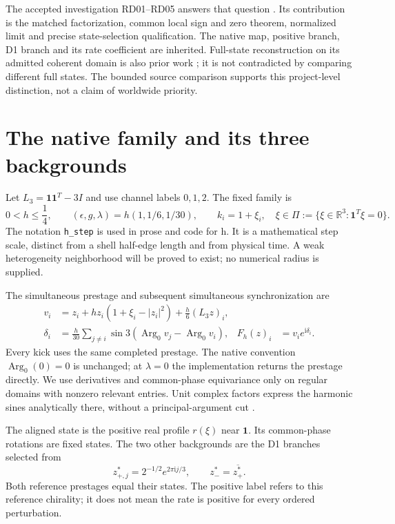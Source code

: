 \documentclass[11pt,a4paper]{article}
\numberwithin{equation}{section}
\theoremstyle{remark}\newtheorem{remark}[theorem]{Remark}
\newcommand{\R}{\mathbb R}\newcommand{\C}{\mathbb C}\newcommand{\one}{\mathbf1}
\newcommand{\iu}{\mathrm i}\newcommand{\Id}{I}\newcommand{\Argz}{\operatorname{Arg}_0}
\begin{document}
The accepted investigation RD01--RD05 answers that question \cite{rd,review}. Its contribution is the matched factorization, common local sign and zero theorem, normalized limit and precise state-selection qualification. The native map, positive branch, D1 branch and its rate coefficient are inherited. Full-state reconstruction on its admitted coherent domain is also prior work \cite{phase}; it is not contradicted by comparing different full states. The bounded source comparison supports this project-level distinction, not a claim of worldwide priority.

\clearpage
\section{The native family and its three backgrounds}\label{sec:setting}
Let $L_3=\one\one^T-3I$ and use channel labels $0,1,2$. The fixed family is
\begin{equation}
0<h\le\frac14,\qquad (\epsilon,g,\lambda)=h(1,1/6,1/30),\qquad
k_i=1+\xi_i,\quad \xi\in\Pi:=\{\xi\in\R^3:\one^T\xi=0\}.
\label{eq:family}
\end{equation}
The notation \texttt{h\_step} is used in prose and code for h. It is a mathematical step scale, distinct from a shell half-edge length and from physical time. A weak heterogeneity neighborhood will be proved to exist; no numerical radius is supplied.

The simultaneous prestage and subsequent simultaneous synchronization are
\begin{align}
v_i&=z_i+h z_i(1+\xi_i-|z_i|^2)+\frac h6(L_3z)_i,\label{eq:pre}\\
\delta_i&=\frac h{30}\sum_{j\ne i}\sin3(\Argz v_j-\Argz v_i),
&F_h(z)_i&=v_i e^{\iu\delta_i}.\label{eq:post}
\end{align}
Every kick uses the same completed prestage. The native convention $\Argz(0)=0$ is unchanged; at $\lambda=0$ the implementation returns the prestage directly. We use derivatives and common-phase equivariance only on regular domains with nonzero relevant entries. Unit complex factors express the harmonic sines analytically there, without a principal-argument cut \cite[D5--D7]{drift}.

The aligned state is the positive real profile $r(\xi)$ near $\one$. Its common-phase rotations are fixed states. The two other backgrounds are the D1 branches selected from
\begin{equation}
z^*_{+,j}=2^{-1/2}e^{2\pi\iu j/3},\qquad
z^*_- =\overline{z^*_+}.
\label{eq:references}
\end{equation}
Both reference prestages equal their states. The positive label refers to this reference chirality; it does not mean the rate is positive for every ordered perturbation.
\end{document}

